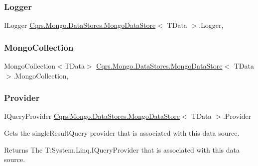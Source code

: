 \subsubsection{\texorpdfstring{Logger}{Logger}}
{\footnotesize\ttfamily I\+Logger \hyperlink{classCqrs_1_1Mongo_1_1DataStores_1_1MongoDataStore}{Cqrs.\+Mongo.\+Data\+Stores.\+Mongo\+Data\+Store}$<$ T\+Data $>$.Logger\hspace{0.3cm}{\ttfamily [get]}, {\ttfamily [protected]}}

\mbox{\label{classCqrs_1_1Mongo_1_1DataStores_1_1MongoDataStore_aa183a8ce44ec16d755f1e4fbe5ec4b10}} 
\subsubsection{\texorpdfstring{Mongo\+Collection}{MongoCollection}}
{\footnotesize\ttfamily Mongo\+Collection$<$T\+Data$>$ \hyperlink{classCqrs_1_1Mongo_1_1DataStores_1_1MongoDataStore}{Cqrs.\+Mongo.\+Data\+Stores.\+Mongo\+Data\+Store}$<$ T\+Data $>$.Mongo\+Collection\hspace{0.3cm}{\ttfamily [get]}, {\ttfamily [protected]}}

\mbox{\label{classCqrs_1_1Mongo_1_1DataStores_1_1MongoDataStore_ae5de32a7a0da67a8aeaed9653db796ce}} 
\subsubsection{\texorpdfstring{Provider}{Provider}}
{\footnotesize\ttfamily I\+Query\+Provider \hyperlink{classCqrs_1_1Mongo_1_1DataStores_1_1MongoDataStore}{Cqrs.\+Mongo.\+Data\+Stores.\+Mongo\+Data\+Store}$<$ T\+Data $>$.Provider\hspace{0.3cm}{\ttfamily [get]}}



Gets the single\+Result\+Query provider that is associated with this data source. 

\begin{DoxyReturn}{Returns}
The T\+:\+System.\+Linq.\+I\+Query\+Provider that is associated with this data source. 
\end{DoxyReturn}
